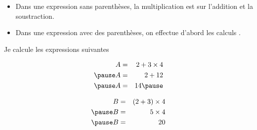 \documentclass[xcolor={dvipsnames}]{beamer}
\begin{document}
\begin{frame}
	\begin{myprops}
		\begin{itemize}
			\item Dans une expression sans parenthèses, la multiplication est  sur l'addition et la soustraction.\pause
			
			\item Dans une expression avec des parenthèses, on effectue d'abord les calculs .\pause
		\end{itemize}
	\end{myprops}



	\begin{myexs}
		Je calcule les expressions suivantes
		\vspace*{-0.5cm}
		
		\begin{eqnarray*}
			A &=& 2 + 3 \times 4 \\ \pause
			A &=& 2 + 12 \\ \pause
			A &=& 14 \pause
		\end{eqnarray*}
		
			\vspace*{-1cm}
		
		\begin{eqnarray*}
			B &=& (2 + 3) \times 4 \\ \pause
			B &=& 5 \times 4 \\ \pause
			B &=& 20
		\end{eqnarray*}
		
	\end{myexs}
	
\end{frame}
\end{document}
